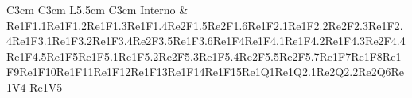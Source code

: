 \begin{longtable}{C{3cm} C{3cm} L{5.5cm} C{3cm}}
Interno & Re1F1.1\newline Re1F1.2\newline Re1F1.3\newline Re1F1.4\newline Re2F1.5\newline Re2F1.6\newline  Re1F2.1\newline Re1F2.2\newline Re2F2.3\newline Re1F2.4\newline Re1F3.1\newline Re1F3.2\newline Re1F3.4\newline Re2F3.5\newline Re1F3.6\newline Re1F4\newline Re1F4.1\newline Re1F4.2\newline Re1F4.3\newline Re2F4.4\newline Re1F4.5\newline Re1F5\newline Re1F5.1\newline Re1F5.2\newline Re2F5.3\newline Re1F5.4\newline Re2F5.5\newline Re2F5.7\newline Re1F7\newline Re1F8\newline Re1F9\newline Re1F10\newline Re1F11\newline Re1F12\newline Re1F13\newline Re1F14\newline Re1F15\newline Re1Q1\newline  Re1Q2.1\newline Re2Q2.2\newline Re2Q6\newline Re1V4
\newline  Re1V5\\


\end{longtable}
